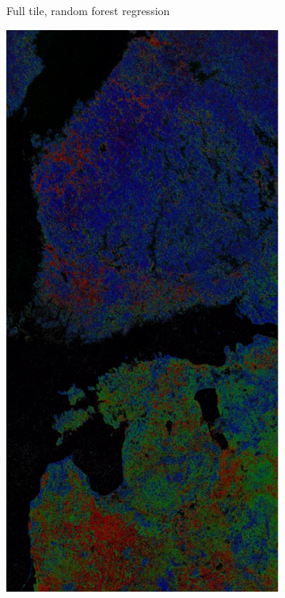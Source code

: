 \documentclass[a4paper,12pt]{scrbook}
\begin{document}
\begin{figure}
\begin{subfigure}[t]{.24\textwidth}
    \caption{Full tile, random forest regression}
    \label{subfig-fulltile-rf}
  \end{subfigure} \hfill
  \begin{subfigure}[t]{.24\textwidth}
    \includegraphics[width=\textwidth]{thesis-figures/figures-qgis/fulltile-nn}

\end{subfigure}
\end{figure}
\end{document}
